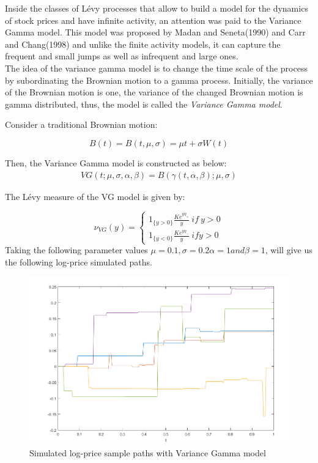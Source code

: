 \documentclass[12pt]{report}
\begin{document}
Inside the classes of Lévy processes that allow to build a model for the dynamics of stock prices and have infinite activity, an attention was paid to the Variance Gamma model. This model was proposed by Madan and Seneta(1990) and Carr and Chang(1998)  and unlike the finite activity models, it can capture the frequent and small jumps as well as infrequent and large ones.\\

The idea of the variance gamma model is to change the time scale of the process by subordinating the Brownian motion to a gamma process. Initially, the variance of the Brownian motion is one, the variance of the changed Brownian motion is gamma distributed, thus, the model is called the \textit{ Variance Gamma  model}. \\   

Consider a traditional Brownian motion:

\[B(t)=B(t,\mu,\sigma)=\mu t +\sigma W(t)\] 

Then, the Variance Gamma model is constructed as below: 
\begin{gather}
 VG(t; \mu,\sigma,\alpha,\beta)=B(\gamma(t,\alpha,\beta);\mu,\sigma) 
\end{gather}


The Lévy measure of the VG model is given by:

 \[\nu_{VG}(y)= \begin{cases} 
  1_{\{y > 0\}} \frac{K e^{y \eta_+}}{y}~ if ~y >0 \\
     1_{\{y < 0\}} \frac{K e^{y \eta_-}}{y}~ if y >0 
         \end{cases}
          \]
Taking the following parameter values $\mu= 0.1,\sigma=0.2 \alpha=1 and \beta=1   $, will give us the following log-price simulated paths.
\begin{figure}[h]

\centering
\includegraphics[scale=0.7]{VG.png} 
\caption{Simulated log-price sample paths with Variance Gamma model }
\end{figure}
\end{document}
